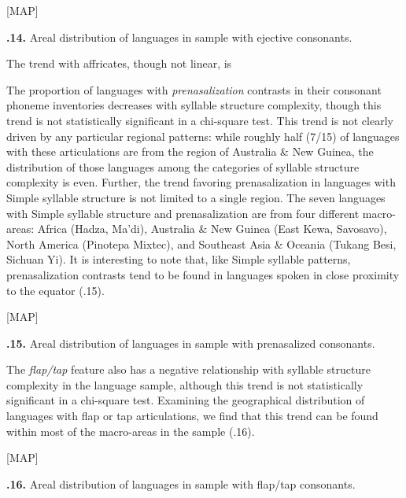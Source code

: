 [MAP]



\textbf{.14.} Areal distribution of languages in sample with ejective consonants.



The trend with affricates, though not linear, is 



  The proportion of languages with \textit{prenasalization} contrasts in their consonant phoneme inventories decreases with syllable structure complexity, though this trend is not statistically significant in a chi-square test. This trend is not clearly driven by any particular regional patterns: while roughly half (7/15) of languages with these articulations are from the region of Australia \& New Guinea, the distribution of those languages among the categories of syllable structure complexity is even. Further, the trend favoring prenasalization in languages with Simple syllable structure is not limited to a single region. The seven languages with Simple syllable structure and prenasalization are from four different macro-areas: Africa (Hadza, Ma’di), Australia \& New Guinea (East Kewa, Savosavo), North America (Pinotepa Mixtec), and Southeast Asia \& Oceania (Tukang Besi, Sichuan Yi). It is interesting to note that, like Simple syllable patterns, prenasalization contrasts tend to be found in languages spoken in close proximity to the equator (.15).



[MAP]



\textbf{.15.} Areal distribution of languages in sample with prenasalized consonants.



  The \textit{flap/tap} feature also has a negative relationship with syllable structure complexity in the language sample, although this trend is not statistically significant in a chi-square test. Examining the geographical distribution of languages with flap or tap articulations, we find that this trend can be found within most of the macro-areas in the sample (.16).



[MAP]



\textbf{.16.} Areal distribution of languages in sample with flap/tap consonants.



